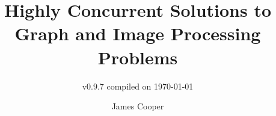 \documentclass[newzealand,10pt,partial,onehalfspace,final]{aucklandthesis}
\theoremstyle{plain}
\begin{document}
\frontmatter

%
%
%
\title{Highly Concurrent Solutions to Graph and Image Processing Problems}
\subtitle{{\small v0.9.7 compiled on \today}}
\author{James Cooper}

\maketitle
{}




\cleardoublepage\tableofcontents
\cleardoublepage\listoffixmes
\cleardoublepage\listoffigures
\cleardoublepage\listoftables
\cleardoublepage\listofcprulesetfloats
\cleardoublepage\listofcpobjectsfloats
\cleardoublepage\printglossary
\cleardoublepage\printglossary[type=\acronymtype]









%
%
%
%
\end{document}
